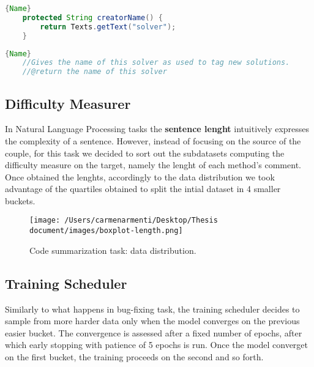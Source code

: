 \begin{lstlisting}[language=Java, caption={Function},label={lst:buggy1}, mathescape=true, breaklines=true]{Name}
    protected String creatorName() {
        return Texts.getText("solver");
    }
\end{lstlisting}

\begin{lstlisting}[language=Java, caption={Comment},label={lst:fixed1}, mathescape=true, breaklines=true]{Name}
    //Gives the name of this solver as used to tag new solutions.
    //@return the name of this solver
\end{lstlisting}



\subsection{Difficulty Measurer}
In Natural Language Processing tasks the \textbf{sentence lenght} intuitively expresses the complexity 
of a sentence. However, instead of focusing on the source of the couple, for this task we decided to sort out the subdatasets computing the
difficulty measure on the target, namely the lenght of each method's comment. 
Once obtained the lenghts, accordingly to the data distribution we took advantage of the quartiles obtained to split the intial dataset in 4 smaller 
buckets. 
\begin{figure}[h!]
    \begin{center}
        \texttt{[image: /Users/carmenarmenti/Desktop/Thesis document/images/boxplot-length.png]}
        \caption{\label{fig:CSdistribution}Code summarization task: data distribution.}
    \end{center}
\end{figure}

\subsection{Training Scheduler}
Similarly to what happens in bug-fixing task, the training scheduler decides to sample from more harder data only when the model converges on the 
previous easier bucket. The convergence is assessed after a fixed number of epochs, after which early stopping with patience of 5 epochs
is run. Once the model converget on the first bucket, the training proceeds on the second and so forth. 

